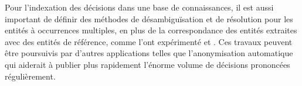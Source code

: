 Pour l'indexation des décisions dans une base de connaissances, il est aussi important de définir des méthodes de désambiguïsation et de résolution pour les entités à occurrences multiples, en plus de la correspondance des entités extraites avec des entités de référence, comme l'ont expérimenté \citet{dozier2010legalnerr} et \citet{cardellino2017legalNERCL}. Ces travaux peuvent être poursuivis par d'autres applications telles que l'anonymisation automatique qui aiderait à publier plus rapidement l'énorme volume de décisions prononcées régulièrement.